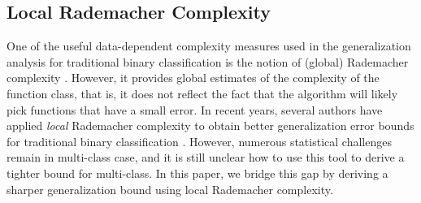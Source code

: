 \documentclass{article}
\begin{document}
\subsection{Local Rademacher Complexity}
One of the useful data-dependent complexity measures used in the generalization analysis
for  traditional  binary classification
is the notion of (global) Rademacher complexity \cite{bartlett2003rademacher,koltchinskii2002empirical}.
However,
it provides global estimates of the complexity of the function class,
that is, it does not reflect
the fact that the algorithm will likely pick functions that have a small error.
In recent years,
several authors have applied
 \emph{local} Rademacher complexity to obtain  better generalization error bounds
for traditional binary classification \cite{Bartlett2005lrc,Koltchinskii2006lrcoiirm}.
However,
numerous statistical challenges remain in multi-class case, and it is still unclear how to use
this tool to derive a tighter bound for multi-class.
In this paper,
we bridge this gap by deriving a sharper generalization bound using local Rademacher complexity.
\end{document}

